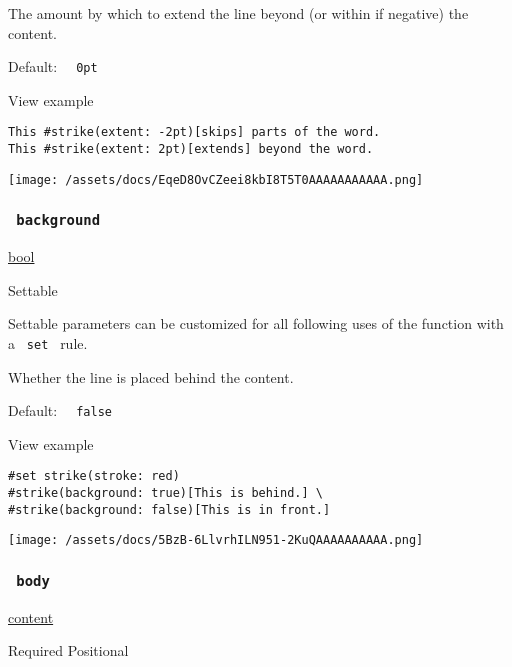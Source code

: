 The amount by which to extend the line beyond (or within if negative)
the content.

Default: \texttt{\ }{\texttt{\ 0pt\ }}\texttt{\ }


View example

\begin{verbatim}
This #strike(extent: -2pt)[skips] parts of the word.
This #strike(extent: 2pt)[extends] beyond the word.
\end{verbatim}

\texttt{[image: /assets/docs/EqeD8OvCZeei8kbI8T5T0AAAAAAAAAAA.png]}

\subsubsection{\texorpdfstring{\texttt{\ background\ }}{ background }}\label{parameters-background}

\href{/docs/reference/foundations/bool/}{bool}

{{ Settable }}

\label{parameters-background-settable-tooltip}
Settable parameters can be customized for all following uses of the
function with a \texttt{\ set\ } rule.

Whether the line is placed behind the content.

Default: \texttt{\ }{\texttt{\ false\ }}\texttt{\ }


View example

\begin{verbatim}
#set strike(stroke: red)
#strike(background: true)[This is behind.] \
#strike(background: false)[This is in front.]
\end{verbatim}

\texttt{[image: /assets/docs/5BzB-6LlvrhILN951-2KuQAAAAAAAAAA.png]}

\subsubsection{\texorpdfstring{\texttt{\ body\ }}{ body }}\label{parameters-body}

\href{/docs/reference/foundations/content/}{content}

{Required} {{ Positional }}

